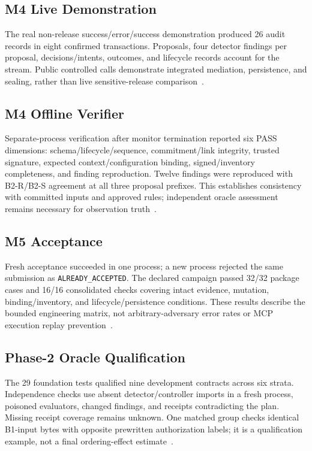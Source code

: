 \documentclass[conference]{IEEEtran}
\begin{document}
\subsection{M4 Live Demonstration}
The real non-release success/error/success demonstration produced 26 audit records in eight confirmed transactions. Proposals, four detector findings per proposal, decisions/intents, outcomes, and lifecycle records account for the stream. Public controlled calls demonstrate integrated mediation, persistence, and sealing, rather than live sensitive-release comparison~\cite{cgresults}.

\subsection{M4 Offline Verifier}
Separate-process verification after monitor termination reported six PASS dimensions: schema/lifecycle/sequence, commitment/link integrity, trusted signature, expected context/configuration binding, signed/inventory completeness, and finding reproduction. Twelve findings were reproduced with B2-R/B2-S agreement at all three proposal prefixes. This establishes consistency with committed inputs and approved rules; independent oracle assessment remains necessary for observation truth~\cite{cgresults,cgthreat}.

\subsection{M5 Acceptance}
Fresh acceptance succeeded in one process; a new process rejected the same submission as \texttt{ALREADY\_ACCEPTED}. The declared campaign passed 32/32 package cases and 16/16 consolidated checks covering intact evidence, mutation, binding/inventory, and lifecycle/persistence conditions. These results describe the bounded engineering matrix, not arbitrary-adversary error rates or MCP execution replay prevention~\cite{cgresults}.

\subsection{Phase-2 Oracle Qualification}
The 29 foundation tests qualified nine development contracts across six strata. Independence checks use absent detector/controller imports in a fresh process, poisoned evaluators, changed findings, and receipts contradicting the plan. Missing receipt coverage remains unknown. One matched group checks identical B1-input bytes with opposite prewritten authorization labels; it is a qualification example, not a final ordering-effect estimate~\cite{cgresults,cgprotocol}.
\end{document}
